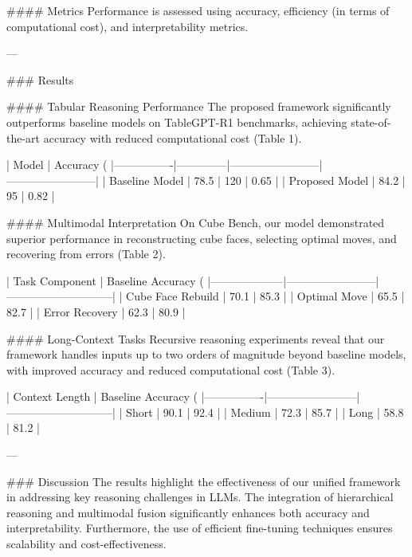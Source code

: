 #### Metrics  
Performance is assessed using accuracy, efficiency (in terms of computational cost), and interpretability metrics.  

---

### Results  

#### Tabular Reasoning Performance  
The proposed framework significantly outperforms baseline models on TableGPT-R1 benchmarks, achieving state-of-the-art accuracy with reduced computational cost (Table 1).  

| Model          | Accuracy (%
|----------------|--------------|------------------------|------------------------|
| Baseline Model | 78.5         | 120                    | 0.65                   |
| Proposed Model | 84.2         | 95                     | 0.82                   |

#### Multimodal Interpretation  
On Cube Bench, our model demonstrated superior performance in reconstructing cube faces, selecting optimal moves, and recovering from errors (Table 2).  

| Task Component     | Baseline Accuracy (%
|--------------------|------------------------|-----------------------------|
| Cube Face Rebuild  | 70.1                  | 85.3                        |
| Optimal Move       | 65.5                  | 82.7                        |
| Error Recovery     | 62.3                  | 80.9                        |

#### Long-Context Tasks  
Recursive reasoning experiments reveal that our framework handles inputs up to two orders of magnitude beyond baseline models, with improved accuracy and reduced computational cost (Table 3).  

| Context Length | Baseline Accuracy (%
|----------------|------------------------|-----------------------------|
| Short          | 90.1                  | 92.4                        |
| Medium         | 72.3                  | 85.7                        |
| Long           | 58.8                  | 81.2                        |

---

### Discussion  
The results highlight the effectiveness of our unified framework in addressing key reasoning challenges in LLMs. The integration of hierarchical reasoning and multimodal fusion significantly enhances both accuracy and interpretability. Furthermore, the use of efficient fine-tuning techniques ensures scalability and cost-effectiveness.  

